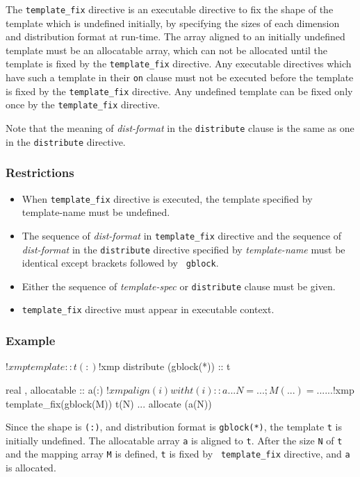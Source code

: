 The {\tt template\_fix} directive is an executable directive to fix the
shape of the template which is undefined initially, by specifying the
sizes of each dimension and distribution format at run-time. The array
aligned to an initially undefined template must be an allocatable
array, which can not be allocated until the template is fixed by the
{\tt template\_fix} directive. Any executable directives which have such a
template in their {\tt on} clause must not be executed before the
template is fixed by the
{\tt template\_fix} directive. Any undefined template can be fixed only
once by the {\tt template\_fix} directive. 

Note that the meaning of
{\it dist-format} in the {\tt distribute} clause is the same as one in
the {\tt distribute} directive.

\subsubsection*{Restrictions}
\begin{itemize}
\item When {\tt template\_fix} directive is executed, the
template specified by template-name  must be undefined.
\item The sequence
of {\it dist-format} in {\tt template\_fix} directive and the sequence
of {\it dist-format} in the {\tt distribute} directive specified by
{\it template-name} must be identical except brackets followed by {\tt
  gblock}. 
\item Either the sequence of {\it template-spec} or {\tt distribute}
  clause must be given. 
\item {\tt template\_fix} directive must appear in executable context.
\end{itemize}

\subsubsection*{Example}

\begin{Fexample}
!$xmp template :: t(:)
!$xmp distribute (gblock(*)) :: t

      real , allocatable :: a(:)
!$xmp align (i) with t(i) :: a
      ...
      N = ...; M(...) = ...
      ...
!$xmp template_fix(gblock(M)) t(N)
      ...
      allocate (a(N))
\end{Fexample}

Since the shape is {\tt (:)}, and distribution format is {\tt gblock(*)},
the template {\tt t} is initially undefined. The allocatable array
{\tt a} is aligned to {\tt t}. After the size {\tt N} of {\tt t} and the
mapping array {\tt M} is defined, {\tt t} is fixed by {\tt
  template\_fix} directive, and {\tt a} is allocated.
